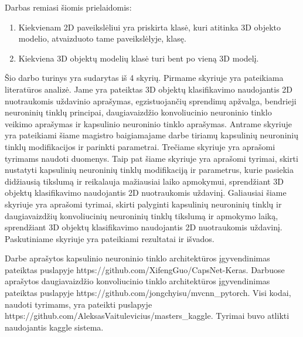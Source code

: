 Darbas remiasi šiomis prielaidomis:

\begin{enumerate}
	\item Kiekvienam 2D paveikslėliui yra priskirta klasė, kuri atitinka 3D objekto modelio, atvaizduoto tame paveikslėlyje, klasę.
	\item Kiekviena 3D objektų modelių klasė turi bent po vieną 3D modelį.
\end{enumerate}

Šio darbo turinys yra sudarytas iš 4 skyrių. Pirmame skyriuje yra pateikiama literatūros analizė. Jame yra pateiktas 3D objektų klasifikavimo naudojantis 2D nuotraukomis uždavinio aprašymas, egzistuojančių sprendimų apžvalga, bendrieji neuroninių tinklų principai, daugiavaizdžio konvoliucinio neuroninio tinklo veikimo aprašymas ir kapsulinio neuroninio tinklo aprašymas.
Antrame skyriuje yra pateikiami šiame magistro baigiamajame darbe tiriamų kapsulinių neuroninių tinklų modifikacijos ir parinkti parametrai.
Trečiame skyriuje yra aprašomi tyrimams naudoti duomenys.
Taip pat šiame skyriuje yra aprašomi tyrimai, skirti nustatyti kapsulinių neuroninių tinklų modifikaciją ir parametrus, kurie pasiekia didžiausią tikslumą ir reikalauja mažiausiai laiko apmokymui, sprendžiant 3D objektų klasifikavimo naudojantis 2D nuotraukomis uždavinį.
Galiausiai šiame skyriuje yra aprašomi tyrimai, skirti palyginti kapsulinių neuroninių tinklų ir daugiavaizdžių konvoliucinių neuroninių tinklų tikslumą ir apmokymo laiką, sprendžiant 3D objektų klasifikavimo naudojantis 2D nuotraukomis uždavinį.
Paskutiniame skyriuje yra pateikiami rezultatai ir išvados.

Darbe \cite{capsNet} aprašytos kapsulinio neuroninio tinklo architektūros įgyvendinimas pateiktas puslapyje https://github.com/XifengGuo/CapsNet-Keras. Darbuose \cite{cnnExp1, cnnExp2} aprašytos daugiavaizdžio konvoliucinio tinklo architektūros įgyvendinimas pateiktas puslapyje https://github.com/jongchyisu/mvcnn\_pytorch. Visi kodai, naudoti tyrimams, yra pateikti puslapyje https://github.com/AleksasVaitulevicius/masters\_kaggle. Tyrimai buvo atlikti naudojantis kaggle sistema.
